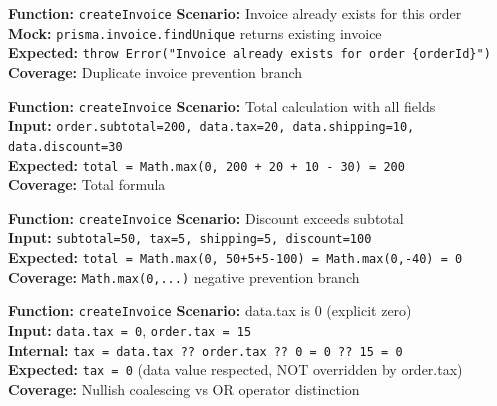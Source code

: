 ﻿\documentclass[12pt,a4paper]{report}
\newcommand{\ptwo}{\textbf{\color{p2orange}P2}}
\begin{document}
\begin{tcolorbox}[criticalbox,title={INV-005 \hfill \ptwo\ --- Duplicate Invoice}]
\textbf{Function:} \texttt{createInvoice} \quad \textbf{Scenario:} Invoice already exists for this order \\
\textbf{Mock:} \texttt{prisma.invoice.findUnique} returns existing invoice \\
\textbf{Expected:} \texttt{throw Error("Invoice already exists for order \{orderId\}")} \\
\textbf{Coverage:} Duplicate invoice prevention branch
\end{tcolorbox}

\begin{tcolorbox}[testbox,title={INV-006 \hfill \ptwo}]
\textbf{Function:} \texttt{createInvoice} \quad \textbf{Scenario:} Total calculation with all fields \\
\textbf{Input:} \texttt{order.subtotal=200, data.tax=20, data.shipping=10, data.discount=30} \\
\textbf{Expected:} \texttt{total = Math.max(0, 200 + 20 + 10 - 30) = 200} \\
\textbf{Coverage:} Total formula
\end{tcolorbox}

\begin{tcolorbox}[criticalbox,title={INV-007 \hfill \ptwo\ --- Negative Total Prevention}]
\textbf{Function:} \texttt{createInvoice} \quad \textbf{Scenario:} Discount exceeds subtotal \\
\textbf{Input:} \texttt{subtotal=50, tax=5, shipping=5, discount=100} \\
\textbf{Expected:} \texttt{total = Math.max(0, 50+5+5-100) = Math.max(0,-40) = 0} \\
\textbf{Coverage:} \texttt{Math.max(0,...)} negative prevention branch
\end{tcolorbox}

\begin{tcolorbox}[criticalbox,title={INV-008 \hfill \ptwo\ --- Nullish Coalescing}]
\textbf{Function:} \texttt{createInvoice} \quad \textbf{Scenario:} data.tax is 0 (explicit zero) \\
\textbf{Input:} \texttt{data.tax = 0}, \texttt{order.tax = 15} \\
\textbf{Internal:} \texttt{tax = data.tax ?? order.tax ?? 0 = 0 ?? 15 = 0} \\
\textbf{Expected:} \texttt{tax = 0} (data value respected, NOT overridden by order.tax) \\
\textbf{Coverage:} Nullish coalescing vs OR operator distinction
\end{tcolorbox}
\end{document}
